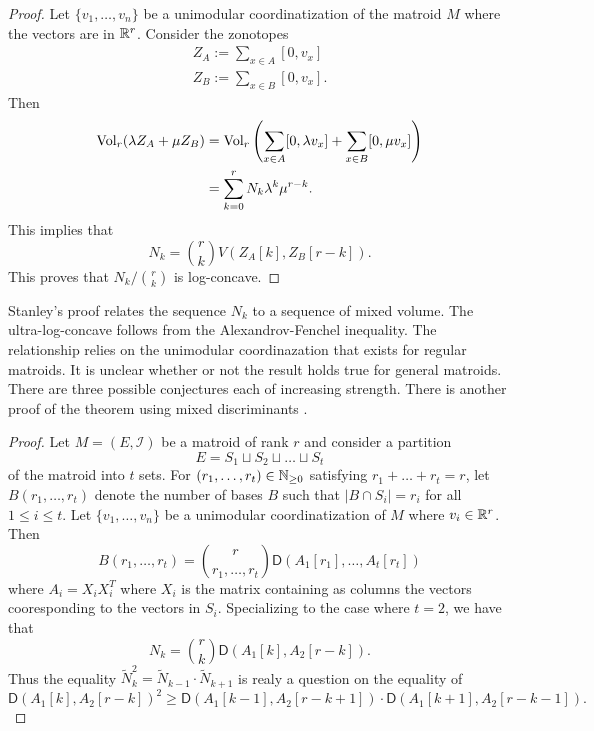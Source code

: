 \documentclass[12pt]{article}
\begin{document}
\begin{proof}
	Let $\{v_1, \ldots, v_n\}$ be a unimodular coordinatization of the matroid $M$ where the vectors are in $\mathbb{R}^r$. Consider the zonotopes
	\begin{align*}
		Z_A := \sum_{x \in A} [0, v_x] \\
		Z_B := \sum_{x \in B} [0, v_x].
	\end{align*}
	Then 
	\begin{align*}
		\operatorname{Vol}_r (\lambda Z_A + \mu Z_B) & = \operatorname{Vol}_r \left ( \sum_{x \in A} [0, \lambda v_x] + \sum_{x \in B} [0, \mu v_x] \right ) \\
		& = \sum_{k = 0}^r N_k \lambda^k \mu^{r-k}.
	\end{align*}
	This implies that 
	\[
		N_k = \binom{r}{k} V(Z_A[k], Z_B[r-k]). 
	\]
	This proves that $N_k / \binom{r}{k}$ is log-concave. 
\end{proof}

Stanley's proof relates the sequence $N_k$ to a sequence of mixed volume. The ultra-log-concave follows from the Alexandrov-Fenchel inequality. The relationship relies on the unimodular coordinazation that exists for regular matroids. It is unclear whether or not the result holds true for general matroids. There are three possible conjectures each of increasing strength. There is another proof of the theorem using mixed discriminants \cite{bapat_raghavan_1997}. 

\begin{proof}
	Let $M = (E, \mathcal{I})$ be a matroid of rank $r$ and consider a partition 
	\[
		E = S_1 \sqcup S_2 \sqcup \ldots \sqcup S_t
	\]
	of the matroid into $t$ sets. For $(r_1, \ldots, r_t) \in \mathbb{N}_{\geq 0}$ satisfying $r_1 + \ldots + r_t = r$, let $B(r_1, \ldots, r_t)$ denote the number of bases $B$ such that $|B \cap S_i| = r_i$ for all $1 \leq i \leq t$. Let $\{v_1, \ldots, v_n\}$ be a unimodular coordinatization of $M$ where $v_i \in \mathbb{R}^r$. Then 
	\[
		B(r_1, \ldots, r_t) = \binom{r}{r_1, \ldots, r_t} \mathsf{D} (A_1 [r_1], \ldots, A_t [r_t])
	\]
	where $A_i = X_i X_i^T$ where $X_i$ is the matrix containing as columns the vectors cooresponding to the vectors in $S_i$. Specializing to the case where $t = 2$, we have that 
	\[
		N_k = \binom{r}{k} \mathsf{D}(A_1[k], A_2[r-k]). 
	\]
	Thus the equality $\widetilde{N}_k^2 = \widetilde{N}_{k-1} \cdot \widetilde{N}_{k+1}$ is realy a question on the equality of 
	\[
		\mathsf{D}(A_1[k], A_2[r-k])^2 \geq \mathsf{D}(A_1[k-1], A_2[r-k+1]) \cdot \mathsf{D}(A_1[k+1], A_2[r-k-1]). 
	\]
\end{proof}
 
\end{document}
